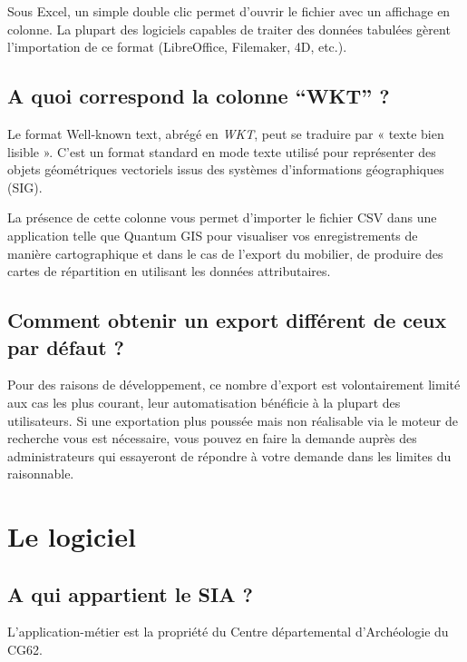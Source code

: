 \documentclass[letterpaper,10pt,french]{sphinxmanual}
\begin{document}
Sous Excel, un simple double clic permet d'ouvrir le fichier avec un affichage en colonne. La plupart des logiciels capables de traiter des données tabulées gèrent l'importation de ce format (LibreOffice, Filemaker, 4D, etc.).


\subsection{A quoi correspond la colonne ``WKT'' ?}
\label{manuel/questions_frequentes:def-wkt}\label{manuel/questions_frequentes:a-quoi-correspond-la-colonne-wkt}
Le format Well-known text, abrégé en \emph{WKT}, peut se traduire par « texte bien lisible ». C'est un format standard en mode texte utilisé pour représenter des objets géométriques vectoriels issus des systèmes d’informations géographiques (SIG).

La présence de cette colonne vous permet d'importer le fichier CSV dans une application telle que Quantum GIS pour visualiser vos enregistrements de manière cartographique et dans le cas de l'export du mobilier, de produire des cartes de répartition en utilisant les données attributaires.


\subsection{Comment obtenir un export différent de ceux par défaut ?}
\label{manuel/questions_frequentes:comment-obtenir-un-export-different-de-ceux-par-defaut}
Pour des raisons de développement, ce nombre d'export est volontairement limité aux cas les plus courant, leur automatisation bénéficie à la plupart des utilisateurs. Si une exportation plus poussée mais non réalisable via le moteur de recherche vous est nécessaire, vous pouvez en faire la demande auprès des administrateurs qui essayeront de répondre à votre demande dans les limites du raisonnable.


\section{Le logiciel}
\label{manuel/questions_frequentes:le-logiciel}

\subsection{A qui appartient le SIA ?}
\label{manuel/questions_frequentes:a-qui-appartient-le-sia}
L'application-métier est la propriété du Centre départemental d'Archéologie du CG62.
\end{document}
